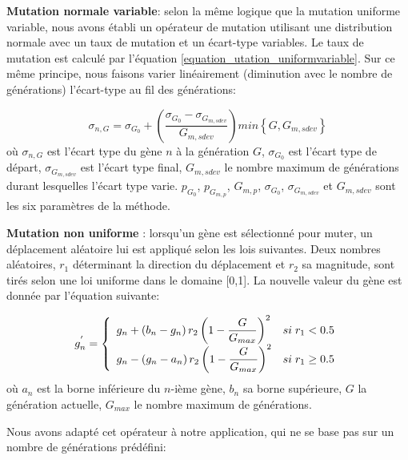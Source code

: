 \documentclass{ametsoc}
\begin{document}
	\item \textbf{Mutation normale variable}: selon la même logique que la mutation uniforme variable, nous avons établi un opérateur de mutation utilisant une distribution normale avec un taux de mutation et un écart-type variables. Le taux de mutation est calculé par l'équation \ref{equation_utation_uniformvariable}. Sur ce même principe, nous faisons varier linéairement (diminution avec le nombre de générations) l'écart-type au fil des générations:
	
	\begin{equation}
	\sigma_{n,G} = \sigma_{G_{0}}+\left( \dfrac{\sigma_{G_{0}}-\sigma_{G_{m,sdev}}}{G_{m,sdev}} \right) min\left\lbrace G,G_{m,sdev}\right\rbrace 
	\label{equation_mutation_normalvariable}
	\end{equation}
	\noindent
	où $\sigma_{n,G}$ est l'écart type du gène $n$ à la génération $G$, $\sigma_{G_{0}}$ est l'écart type de départ, $\sigma_{G_{m,sdev}}$ est l'écart type final, $G_{m,sdev}$ le nombre maximum de générations durant lesquelles l'écart type varie. $p_{G_{0}}$, $p_{G_{m,p}}$, $G_{m,p}$, $\sigma_{G_{0}}$, $\sigma_{G_{m,sdev}}$ et $G_{m,sdev}$ sont les six paramètres de la méthode.
	
	
	\item \textbf{Mutation non uniforme} \citep[\textit{non-uniform mutation},][]{Michalewicz1996}: lorsqu'un gène est sélectionné pour muter, un déplacement aléatoire lui est appliqué selon les lois suivantes. Deux nombres aléatoires, $r_{1}$ déterminant la direction du déplacement et $r_{2}$ sa magnitude, sont tirés selon une loi uniforme dans le domaine [0,1]. La nouvelle valeur du gène est donnée par l'équation suivante:
	
	\begin{equation}
	g_{n}^{'} = 
	\left\lbrace \begin{array}{l l} 
	g_{n} + \left(b_{n}-g_{n}\right) r_{2} \left(1 - \dfrac{G}{G_{max}} \right)^{2} & si \; r_{1} < 0.5 \\
	g_{n} - \left(g_{n}-a_{n}\right) r_{2} \left(1 - \dfrac{G}{G_{max}} \right)^{2} & si \; r_{1} \geq 0.5 \\
	\end{array} \right.
	\label{equation_mutation_nonuniform_original}
	\end{equation}
	\noindent
	où $a_{n}$ est la borne inférieure du $n$-ième gène, $b_{n}$ sa borne supérieure, $G$ la génération actuelle, $G_{max}$ le nombre maximum de générations.
	
	Nous avons adapté cet opérateur à notre application, qui ne se base pas sur un nombre de générations prédéfini:
	
\end{document}
